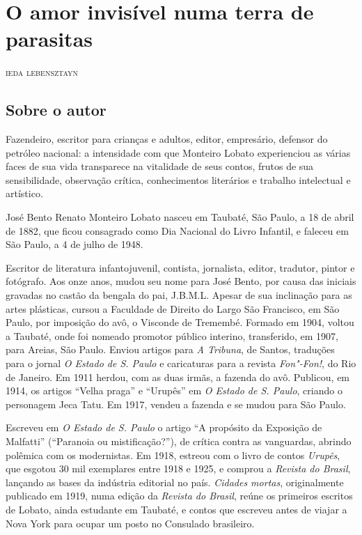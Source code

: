 \chapter{O amor invisível numa terra de parasitas}

\begin{flushright}
\textsc{ieda lebensztayn}
\end{flushright}\medskip

\section{Sobre o autor}

\noindent{}Fazendeiro, escritor para crianças e adultos, editor, empresário,
defensor do petróleo nacional: a intensidade com que Monteiro Lobato
experienciou as várias faces de sua vida transparece na vitalidade de
seus contos, frutos de sua sensibilidade, observação crítica,
conhecimentos literários e trabalho intelectual e artístico.

José Bento Renato Monteiro Lobato nasceu em Taubaté, São Paulo, a 18 de
abril de 1882, que ficou consagrado como Dia Nacional do Livro Infantil,
e faleceu em São Paulo, a 4 de julho de 1948.

Escritor de literatura infantojuvenil, contista, jornalista, editor,
tradutor, pintor e fotógrafo. Aos onze anos, mudou seu nome para José
Bento, por causa das iniciais gravadas no castão da bengala do pai,
J.B.M.L. Apesar de sua inclinação para as artes plásticas, cursou a
Faculdade de Direito do Largo São Francisco, em São Paulo, por imposição
do avô, o Visconde de Tremembé. Formado em 1904, voltou a Taubaté, onde
foi nomeado promotor público interino, transferido, em 1907, para
Areias, São Paulo. Enviou artigos para \emph{A Tribuna}, de Santos,
traduções para o jornal \emph{O Estado de S. Paulo} e caricaturas para a
revista \emph{Fon"-Fon!}, do Rio de Janeiro. Em 1911 herdou, com as duas
irmãs, a fazenda do avô. Publicou, em 1914, os artigos ``Velha praga'' e
``Urupês'' em \emph{O Estado de S. Paulo}, criando o personagem Jeca
Tatu. Em 1917, vendeu a fazenda e se mudou para São Paulo.

Escreveu em \emph{O Estado de S. Paulo} o artigo ``A propósito da
Exposição de Malfatti'' (``Paranoia ou mistificação?''), de crítica
contra as vanguardas, abrindo polêmica com os modernistas. Em 1918,
estreou com o livro de contos \emph{Urupês}, que esgotou 30 mil
exemplares entre 1918 e 1925, e comprou a \emph{Revista do Brasil},
lançando as bases da indústria editorial no país. \emph{Cidades mortas},
originalmente publicado em 1919, numa edição da \emph{Revista do
Brasil}, reúne os primeiros escritos de Lobato, ainda estudante em
Taubaté, e contos que escreveu antes de viajar a Nova York para ocupar
um posto no Consulado brasileiro.

